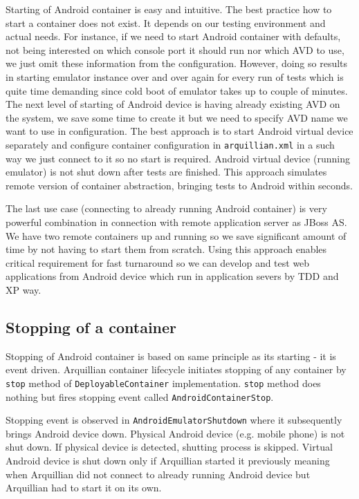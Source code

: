 \documentclass[12pt,final,oneside]{fithesis}
\begin{document}
Starting of Android container is easy and intuitive. The best practice how to start a container does not exist. It depends on our testing environment and actual needs. For instance, if we need to start Android container with defaults, not being interested on which console port it should run nor which AVD to use, we just omit these information from the configuration. However, doing so results in starting emulator instance over and over again for every run of tests which is quite time demanding since cold boot of emulator takes up to couple of minutes. The next level of starting of Android device is having already existing AVD on the system, we save some time to create it but we need to specify AVD name we want to use in configuration. The best approach is to start Android virtual device separately and configure container configuration in \texttt{arquillian.xml} in a such way we just connect to it so no start is required. Android virtual device (running emulator) is not shut down after tests are finished. This approach simulates remote version of container abstraction, bringing tests to Android within seconds.

The last use case (connecting to already running Android container) is very powerful combination in connection with remote application server as JBoss AS. We have two remote containers up and running so we save significant amount of time by not having to start them from scratch. Using this approach enables critical requirement for fast turnaround so we can develop and test web applications from Android device which run in application severs by TDD and XP way.  

		\subsection{Stopping of a container}

Stopping of Android container is based on same principle as its starting - it is event driven. Arquillian container lifecycle initiates stopping of any container by \texttt{stop} method of \texttt{DeployableContainer} implementation. \texttt{stop} method does nothing but fires stopping event called \texttt{AndroidContainerStop}.

Stopping event is observed in \texttt{AndroidEmulatorShutdown} where it subsequently brings Android device down. Physical Android device (e.g. mobile phone) is not shut down. If physical device is detected, shutting process is skipped. Virtual Android device is shut down only if Arquillian started it previously meaning when Arquillian did not connect to already running Android device but Arquillian had to start it on its own.
\end{document}

